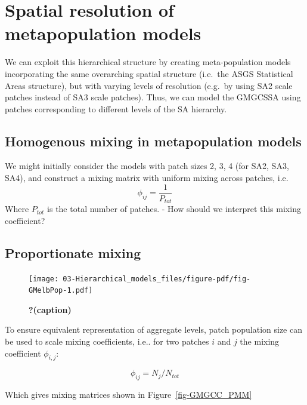 \documentclass[
  letterpaper,
  DIV=11,
  numbers=noendperiod]{scrreprt}
\begin{document}
\hypertarget{spatial-resolution-of-metapopulation-models}{%
\section{Spatial resolution of metapopulation
models}\label{spatial-resolution-of-metapopulation-models}}

We can exploit this hierarchical structure by creating meta-population
models incorporating the same overarching spatial structure (i.e.~the
ASGS Statistical Areas structure), but with varying levels of resolution
(e.g.~by using SA2 scale patches instead of SA3 scale patches). Thus, we
can model the GMGCSSA using patches corresponding to different levels of
the SA hierarchy.

\hypertarget{homogenous-mixing-in-metapopulation-models}{%
\subsection{Homogenous mixing in metapopulation
models}\label{homogenous-mixing-in-metapopulation-models}}

We might initially consider the models with patch sizes 2, 3, 4 (for
SA2, SA3, SA4), and construct a mixing matrix with uniform mixing across
patches, i.e.~\[
\phi_{ij} = \frac{1}{P_{tot}}
\] Where \(P_{tot}\) is the total number of patches. - How should we
interpret this mixing coefficient?

\hypertarget{proportionate-mixing}{%
\subsection{Proportionate mixing}\label{proportionate-mixing}}

\begin{figure}

{\centering \texttt{[image: 03-Hierarchical\_models\_files/figure-pdf/fig-GMelbPop-1.pdf]}

}

\caption{\label{fig-GMelbPop}\textbf{?(caption)}}

\end{figure}

To ensure equivalent representation of aggregate levels, patch
population size can be used to scale mixing coefficients, i.e.. for two
patches \(i\) and \(j\) the mixing coefficient \(\phi_{i,j}\):

\[
\phi_{ij} = N_j/N_{tot}
\]

Which gives mixing matrices shown in Figure~\ref{fig-GMGCC_PMM}
\end{document}

